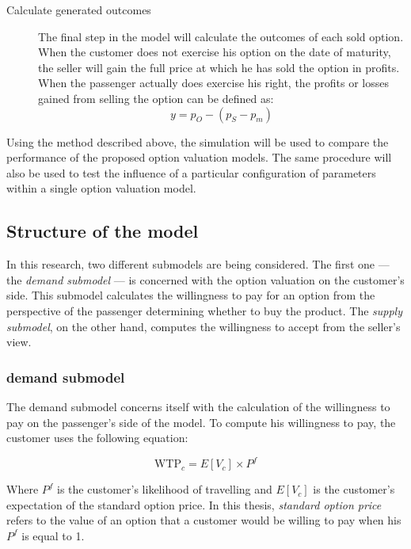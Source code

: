 \begin{description}

\item[Calculate generated outcomes] The final step in the model will calculate the outcomes of each sold option. When the customer does not exercise his option on the date of maturity, the seller will gain the full price at which he has sold the option in profits. When the passenger actually does exercise his right, the profits or losses gained from selling the option can be defined as:
$$ y = p_O - (p_S - p_m) $$
\end{description}

Using the method described above, the simulation will be used to compare the performance of the proposed option valuation models. The same procedure will also be used to test the influence of a particular configuration of parameters within a single option valuation model.




\subsection{Structure of the model}
In this research, two different submodels are being considered. The first one --- the \emph{demand submodel} --- is concerned with the option valuation on the customer's side. This submodel calculates the willingness to pay for an option from the perspective of the passenger determining whether to buy the product. The \emph{supply submodel}, on the other hand, computes the willingness to accept from the seller's view.

\subsubsection{demand submodel}
The demand submodel concerns itself with the calculation of the willingness to pay on the passenger's side of the model. To compute his willingness to pay, the customer uses the following equation:

$$ \mbox{WTP}_c = E[V_c] \times P^f $$

Where $P^f$ is the customer's likelihood of travelling and $E[V_c]$ is the customer's expectation of the standard option price. In this thesis, \emph{standard option price} refers to the value of an option that a customer would be willing to pay when his $P^f$ is equal to 1.


